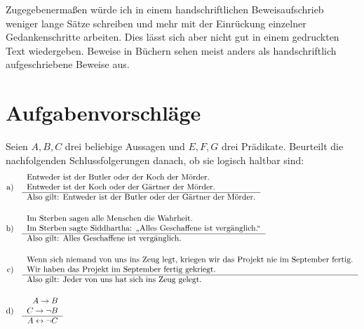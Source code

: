 Zugegebenermaßen würde ich in einem handschriftlichen Beweisaufschrieb weniger lange Sätze schreiben und mehr mit der Einrückung einzelner Gedankenschritte arbeiten. Dies lässt sich aber nicht gut in einem gedruckten Text wiedergeben. Beweise in Büchern sehen meist anders als handschriftlich aufgeschriebene Beweise aus.


 
 
\newpage
\section{Aufgabenvorschläge}



\begin{aufg}
Seien $A,B,C$ drei beliebige Aussagen und $E,F,G$ drei Prädikate. Beurteilt die nachfolgenden Schlussfolgerungen danach, ob sie logisch haltbar sind:
\begin{align*}
 \text{a)}\quad&\begin{tabular}{l}
  Entweder ist der Butler oder der Koch der Mörder. \\
  Entweder ist der Koch oder der Gärtner der Mörder. \\ \hline
Also gilt: Entweder ist der Butler oder der Gärtner der Mörder.
 \end{tabular}  \\[1em]
\text{b)}\quad  &\begin{tabular}{l}
Im Sterben sagen alle Menschen die Wahrheit. \\
Im Sterben sagte Siddhartha: „Alles Geschaffene ist vergänglich.“ \\ \hline
Also gilt: Alles Geschaffene ist vergänglich.
 \end{tabular}  \\[1em]
\text{c)}\quad &\begin{tabular}{l}
Wenn sich niemand von uns ins Zeug legt, kriegen wir das Projekt nie im September fertig. \\
Wir haben das Projekt im September fertig gekriegt. \\ \hline
Also gilt: Jeder von uns hat sich ins Zeug gelegt.
 \end{tabular}  \\[1em]
 \text{d)}\quad&\begin{tabular}{r}
 $A\to B$ \\
 $C\to \neg B$ \\ \hline
 $A\leftrightarrow \neg C$
 \end{tabular} \\[1em]

\end{align*}
\end{aufg}
